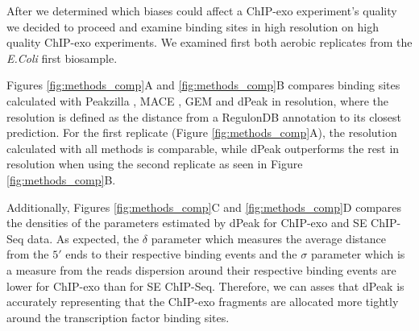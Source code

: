 \documentclass{bmcart}\usepackage[]{graphicx}\usepackage[]{color}
\begin{document}
After we determined which biases could affect a ChIP-exo experiment's
quality we decided to proceed and examine binding sites in high
resolution on high quality ChIP-exo experiments. We examined first
both aerobic replicates from the \emph{E.Coli} first biosample.

Figures \ref{fig:methods_comp}A and \ref{fig:methods_comp}B compares
binding sites calculated with Peakzilla \cite{peakzilla}, MACE
\cite{mace}, GEM \cite{gem} and dPeak \cite{dpeak} in resolution,
where the resolution is defined as the distance from a RegulonDB
annotation to its closest prediction. For the first replicate (Figure
\ref{fig:methods_comp}A), the resolution calculated with all methods
is comparable, while dPeak outperforms the rest in resolution when
using the second replicate as seen in Figure \ref{fig:methods_comp}B. 

Additionally, Figures \ref{fig:methods_comp}C and
\ref{fig:methods_comp}D compares the densities of the parameters
estimated by dPeak for ChIP-exo and SE ChIP-Seq data. As expected, the
$\delta$ parameter which measures the average distance from the
$5\prime$ ends to their respective binding events and the $\sigma$
parameter which is a measure from the reads dispersion around their
respective binding events are lower for ChIP-exo than for SE
ChIP-Seq. Therefore, we can asses that dPeak is accurately
representing that the ChIP-exo fragments are allocated more tightly
around the transcription factor binding sites.

\end{document}
